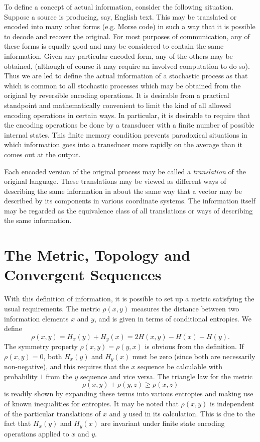 \documentclass{article}[12pt, letter]
\begin{document}
To define a concept of actual information, consider the following situation. Suppose a source is producing, say, English text. This may be translated or encoded into many other forms (e.g. Morse code) in such a way that it is possible to decode and recover the original. For most purposes of communication, any of these forms is equally good and may be considered to contain the same information. Given any particular encoded form, any of the others may be obtained, (although of course it may require an involved computation to do so). Thus we are led to define the actual information of a stochastic process as that which is common to all stochastic processes which may be obtained from the original by reversible encoding operations. It is desirable from a practical standpoint and mathematically convenient to limit the kind of all allowed encoding operations in certain ways. In particular, it is desirable to require that the encoding operations be done by a transducer with a finite number of possible internal states. This finite memory condition prevents paradoxical situations in which information goes into a transducer more rapidly on the average than it comes out at the output.

Each encoded version of the original process may be called a \textit{translation} of the original language. These translations may be viewed as different ways of describing the same information in about the same way that a vector may be described by its components in various coordinate systems. The information itself may be regarded as the equivalence class of all translations or ways of describing the same information.

\section{The Metric, Topology and Convergent Sequences}

With this definition of information, it is possible to set up a metric satisfying the usual requirements. The metric $\rho(x,y)$ measures the distance between two information elements $x$ and $y$, and is given in terms of conditional entropies.%
We define
\[
\rho(x, y) = H_x(y) + H_y(x) = 2 H(x,y) - H(x) - H(y).
\]
The symmetry property $\rho(x,y) = \rho(y,x)$ is obvious from the definition. If $\rho(x,y) = 0$, both $H_x(y)$ and $H_y(x)$ must be zero (since both are necessarily non-negative), and this requires that the $x$ sequence be calculable with probability $1$ from the $y$ sequence and vice versa. The triangle law for the metric
\[
\rho(x,y)  + \rho(y,z) \geq \rho(x,z)
\]
is readily shown by expanding these terms into various entropies and making use of known inequalities for entropies. It may be noted that $\rho(x,y)$ is independent of the particular translations of $x$ and $y$ used in its calculation. This is due to the fact that $H_x(y)$ and $H_y(x)$ are invariant under finite state encoding operations applied to $x$ and $y$.
\end{document}
